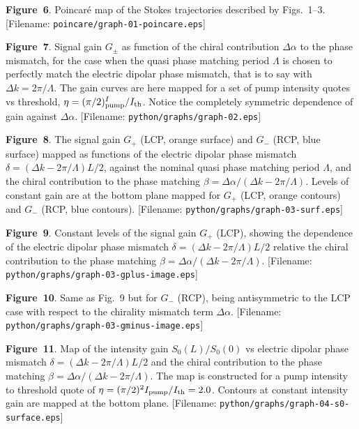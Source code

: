 \centerline{\epsfxsize=310pt}
\medskip
\noindent
{\bf Figure~6}. Poincar\'e map of the Stokes trajectories described by
Figs.~1--3.
[Filename: {\tt poincare/graph-01-poincare.eps}]
\bigskip
\bigskip
\centerline{\epsfxsize=250pt}
\medskip
\noindent
{\bf Figure~7}. Signal gain $G_{\pm}$ as function of the chiral contribution
  $\Delta\alpha$ to the phase mismatch, for the case when the quasi phase
  matching period $\Lambda$ is chosen to perfectly match the electric dipolar
  phase mismatch, that is to say with $\Delta k=2\pi/\Lambda$. The gain
  curves are here mapped for a set of pump intensity quotes vs threshold,
  $\eta=(\pi/2)^I_{\rm pump}/I_{\rm th}$. Notice the completely symmetric dependence
  of gain against $\Delta\alpha$.
[Filename: {\tt python/graphs/graph-02.eps}]
\vfill\eject

\centerline{\epsfxsize=240pt}
\medskip
\noindent
{\bf Figure~8}. The signal gain $G_{+}$ (LCP, orange surface) and $G_{-}$
(RCP, blue surface) mapped as functions of the electric dipolar phase
mismatch $\delta=(\Delta k-2\pi/\Lambda)L/2$, against the nominal quasi
phase matching period $\Lambda$, and the chiral contribution to the phase
matching $\beta=\Delta\alpha/(\Delta k-2\pi/\Lambda)$.
Levels of constant gain are at the bottom plane mapped for $G_{+}$ (LCP,
orange contours) and $G_{-}$ (RCP, blue contours).
[Filename: {\tt python/graphs/graph-03-surf.eps}]
\bigskip
\centerline{\epsfxsize=240pt}
\medskip
\noindent
{\bf Figure~9}.
Constant levels of the signal gain $G_+$ (LCP), showing the dependence of the
electric dipolar phase mismatch $\delta=(\Delta k-2\pi/\Lambda)L/2$ relative
the chiral contribution to the phase matching
$\beta=\Delta\alpha/(\Delta k-2\pi/\Lambda)$.
[Filename: {\tt python/graphs/graph-03-gplus-image.eps}]
\vfill\eject

\centerline{\epsfxsize=240pt}
\medskip
\noindent
{\bf Figure~10}.
Same as Fig.~9 but for $G_-$ (RCP), being antisymmetric to the LCP case with
respect to the chirality mismatch term $\Delta\alpha$.
[Filename: {\tt python/graphs/graph-03-gminus-image.eps}]
\bigskip

\centerline{\epsfxsize=240pt}
\medskip
\noindent
{\bf Figure~11}.
Map of the intensity gain $S_0(L)/S_0(0)$ vs electric dipolar phase mismatch
$\delta=(\Delta k-2\pi/\Lambda)L/2$ and the chiral contribution to the phase
matching $\beta=\Delta\alpha/(\Delta k-2\pi/\Lambda)$. The map is constructed
for a pump intensity to threshold quote of
$\eta=(\pi/2)^2I_{\rm pump}/I_{\rm th}=2.0$. Contours at constant intensity gain
are mapped at the bottom plane.
[Filename: {\tt python/graphs/graph-04-s0-surface.eps}]
\vfill\eject

